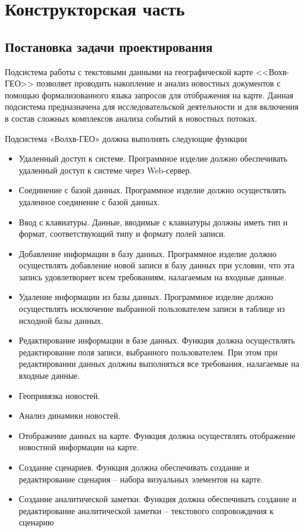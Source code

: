 \section{Конструкторская часть}

\subsection{Постановка задачи проектирования}

Подсистема работы с текстовыми данными на географической карте <<Вохв-ГЕО>> позволяет проводить накопление и анализ новостных документов с помощью формализованного языка запросов для отображения на карте. Данная подсистема предназначена для исследовательской деятельности и для включения в состав сложных комплексов анализа событий в новостных потоках.

Подсистема «Волхв-ГЕО» должна выполнять следующие функции
\begin{itemize}
\item Удаленный доступ к системе. Программное изделие должно обеспечивать удаленный доступ к системе через Web-сервер.
\item Соединение с базой данных. Программное изделие должно осуществлять удаленное соединение с базой данных.
\item Ввод с клавиатуры. Данные, вводимые с клавиатуры должны иметь тип и формат, соответствующий типу и формату полей записи.
\item Добавление информации в базу данных. Программное изделие должно осуществлять добавление новой записи в базу данных при условии, что эта запись удовлетворяет всем требованиям, налагаемым на входные данные.
\item Удаление информации из базы данных. Программное изделие должно осуществлять исключение выбранной пользователем записи в таблице из исходной базы данных.
\item Редактирование информации в базе данных. Функция должна осуществлять редактирование поля записи, выбранного пользователем. При этом при редактировании данных должны выполняться все требования, налагаемые на входные данные.
\item Геопривязка новостей.
\item Анализ динамики новостей.
\item Отображение данных на карте. Функция должна осуществлять отображение новостной информации на карте.
\item Создание сценариев. Функция должна обеспечивать создание и редактирование сценария – набора визуальных элементов на карте.
\item Создание аналитической заметки. Функция должна обеспечивать создание и редактирование аналитической заметки – текстового сопровождения к сценарию
\end{itemize}

